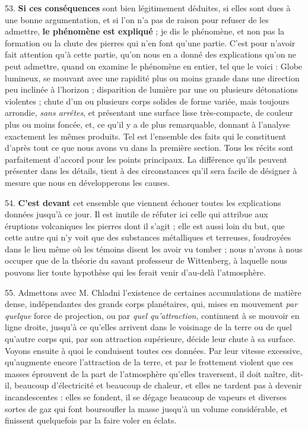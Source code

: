\documentclass[a4paper, 11pt, oneside, polutonikogreek, french]{article}
\begin{document}
53. \textbf{Si ces conséquences} sont bien légitimement déduites, si elles sont dues à une bonne argumentation, et si l'on n'a pas de raison pour refuser de les admettre, \textbf{le phénomène est expliqué} ; je dis le phénomène, et non pas la formation ou la chute des pierres qui n'en font qu'une partie. C'est pour n'avoir fait attention qu'à cette partie, qu'on nous en a donné des explications qu'on ne peut admettre, quand on examine le phénomène en entier, tel que le voici : \og Globe lumineux, se mouvant avec une rapidité plus ou moins grande dans une direction peu inclinée à l'horizon ; disparition de lumière par une ou plusieurs détonations violentes ; chute d'un ou plusieurs corps solides de forme variée, mais toujours arrondie, \emph{sans arrêtes}, et présentant une surface lisse très-compacte, de couleur plus ou moins foncée, et, ce qu'il y a de plus remarquable, donnant à l'analyse exactement les mêmes produits. \fg Tel est l'ensemble des faits qui le constituent d'après tout ce que nous avons vu dans la première section. Tous les récits sont parfaitement d'accord pour les points principaux. La différence qu'ils peuvent présenter dans les détails, tient à des circonstances qu'il sera facile de désigner à mesure que nous en développerons les causes.

54. \textbf{C'est devant} cet ensemble que viennent échouer toutes les explications données jusqu'à ce jour. Il est inutile de réfuter ici celle qui attribue aux éruptions volcaniques les pierres dont il s'agit ; elle est aussi loin du but, que cette autre qui n'y voit que des substances métalliques et terreuses, foudroyées dans le lieu même où les témoins disent les avoir vu tomber ; nous n'avons à nous occuper que de la théorie du savant professeur de Wittenberg, à laquelle nous pouvons lier toute hypothèse qui les ferait venir d'au-delà l'atmosphère.

55. Admettons avec M. Chladni l'existence de certaines accumulations de matière dense, indépendantes des grands corps planétaires, qui, mises en mouvement \emph{par quelque} force de projection, ou par \emph{quel qu’attraction}, continuent à se mouvoir en ligne droite, jusqu'à ce qu'elles arrivent dans le voisinage de la terre ou de quel qu’autre corps qui, par son attraction supérieure, décide leur chute à sa surface. Voyons ensuite à quoi le conduisent toutes ces données. \og Par leur vitesse excessive, qu'augmente encore l'attraction de la terre, et par le frottement violent que ces masses éprouvent de la part de l'atmosphère qu'elles traversent, il doit naître, dit-il, beaucoup d'électricité et beaucoup de chaleur, et elles ne tardent pas à devenir incandescentes : elles se fondent, il se dégage beaucoup de vapeurs et diverses sortes de gaz qui font boursoufler la masse jusqu'à un volume considérable, et finissent quelquefois par la faire voler en éclats. \fg
\end{document}
